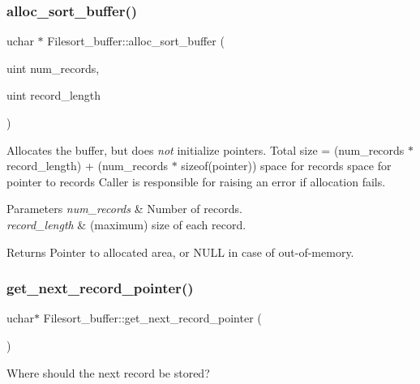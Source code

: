 \subsubsection{\texorpdfstring{alloc\+\_\+sort\+\_\+buffer()}{alloc\_sort\_buffer()}}
{\footnotesize\ttfamily uchar $\ast$ Filesort\+\_\+buffer\+::alloc\+\_\+sort\+\_\+buffer (\begin{DoxyParamCaption}\item[{uint}]{num\+\_\+records,  }\item[{uint}]{record\+\_\+length }\end{DoxyParamCaption})}

Allocates the buffer, but does {\itshape not} initialize pointers. Total size = (num\+\_\+records $\ast$ record\+\_\+length) + (num\+\_\+records $\ast$ sizeof(pointer)) space for records space for pointer to records Caller is responsible for raising an error if allocation fails.


\begin{DoxyParams}{Parameters}
{\em num\+\_\+records} & Number of records. \\
\hline
{\em record\+\_\+length} & (maximum) size of each record. \\
\hline
\end{DoxyParams}
\begin{DoxyReturn}{Returns}
Pointer to allocated area, or N\+U\+LL in case of out-\/of-\/memory. 
\end{DoxyReturn}
\mbox{\label{classFilesort__buffer_a4ab5d2686a9d85b333e9250015b32a1c}} 
\subsubsection{\texorpdfstring{get\+\_\+next\+\_\+record\+\_\+pointer()}{get\_next\_record\_pointer()}}
{\footnotesize\ttfamily uchar$\ast$ Filesort\+\_\+buffer\+::get\+\_\+next\+\_\+record\+\_\+pointer (\begin{DoxyParamCaption}{ }\end{DoxyParamCaption})\hspace{0.3cm}{\ttfamily [inline]}}

Where should the next record be stored? \mbox{\label{classFilesort__buffer_ac13e1d504a855446db9b9eb540bd69b2}} 
